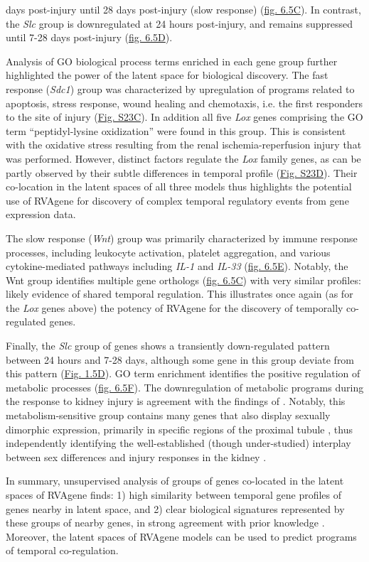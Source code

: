 days post-injury until 28 days post-injury (slow response) (\hyperref[fig:fig6b]{fig. 6.5C}). In
contrast, the {\em Slc} group is downregulated at 24 hours post-injury, and remains suppressed until
7-28 days post-injury (\hyperref[fig:fig6b]{fig. 6.5D}).
\par 
Analysis of GO biological process terms enriched in each gene group further highlighted the power of the latent space for biological discovery. The fast response ({\em Sdc1}) group was characterized by upregulation of programs related to apoptosis, stress response, wound healing and chemotaxis, i.e. the first responders to the site of injury (\hyperref[fig:figS8]{Fig. S23C}). In addition all five {\em Lox} genes comprising the GO term ``peptidyl-lysine oxidization'' were found in this group. This is consistent with the oxidative stress resulting from the renal ischemia-reperfusion injury that was performed. However, distinct factors regulate the {\em Lox} family genes, as can be partly observed by their subtle differences in temporal profile (\hyperref[fig:figS8]{Fig. S23D}). Their co-location in the latent spaces of all three models thus highlights the potential use of RVAgene for discovery of complex temporal regulatory events from gene expression data.
\par
The slow response ({\em Wnt}) group was primarily characterized by immune response processes,
including leukocyte activation, platelet aggregation, and various cytokine-mediated pathways
including {\em IL-1} and {\em IL-33} (\hyperref[fig:fig6b]{fig. 6.5E}). Notably, the Wnt group
identifies multiple gene orthologs (\hyperref[fig:fig6b]{fig. 6.5C}) with very similar profiles: likely evidence of shared temporal regulation. This illustrates once again (as for the {\em Lox} genes above) the potency of RVAgene for the discovery of temporally co-regulated genes.
\par
Finally, the {\em Slc} group of genes shows a transiently down-regulated pattern between 24 hours
and 7-28 days, although some gene in this group deviate from this pattern (\hyperref[fig:fig6b]{Fig.
1.5D}). 
GO term enrichment identifies the positive regulation of metabolic processes
(\hyperref[fig:fig6b]{fig. 6.5F}). The downregulation of metabolic programs during the response to kidney injury is agreement with the findings of \citet{liu2017molecular}. Notably, this metabolism-sensitive group contains many genes that also display sexually dimorphic expression, primarily in specific regions of the proximal tubule \citep{ransick19_singlecell}, thus independently identifying the well-established (though under-studied) interplay between sex differences and injury responses in the kidney \citep{neugarten00_effect}. 
\par 
In summary, unsupervised analysis of groups of genes co-located in the latent spaces of RVAgene finds: 1) high similarity between temporal gene profiles of genes nearby in latent space, and 2) clear biological signatures represented by these groups of nearby genes, in strong agreement with prior knowledge \citep{liu2017molecular}. Moreover, the latent spaces of RVAgene models can be used to predict programs of temporal co-regulation. 
\par


